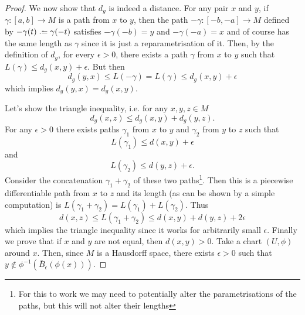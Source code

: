 \documentclass[12pt,twoside]{book}
\begin{document}
\begin{proof}
	We now show that \( d_g \) is indeed a distance.  For
	any pair \( x \) and \( y \), if \( \gamma \colon [a,b] \to M \) is a path from \( x \)
	to \( y \), then the path \( -\gamma \colon [-b,-a] \to M \)  defined by \( -\gamma(t)
	\defeq \gamma(-t) \) satisfies \( -\gamma(-b) = y \) and \( -\gamma(-a) = x \) and of
	course has the same length as \( \gamma \) since it is just a reparametrisation of it.
	Then, by the definition of \( d_g \), for every \( \epsilon > 0 \), there exists a path
	\( \gamma \) from \( x \) to \( y \) such that \( L(\gamma) \leq d_g(x,y) + \epsilon \).
	But then 
	\begin{equation*}
		d_g(y,x) \leq L(-\gamma) = L(\gamma) \leq d_g(x,y) + \epsilon
	\end{equation*}
	which implies \( d_g(y,x) = d_g(x,y) \). 

	Let's show the triangle inequality, i.e. for any \( x,y,z \in M \)
	\begin{equation*}
		d_g(x,z) \leq d_g(x,y) + d_g(y,z).
	\end{equation*}
	For any \( \epsilon > 0 \) there exists paths \( \gamma_1 \) from \( x \) to \( y \) and
	\( \gamma_2 \) from \( y  \) to \( z \) such that
	\begin{equation*}
		L(\gamma_1) \leq d(x,y) + \epsilon
	\end{equation*}
	and
	\begin{equation*}
		L(\gamma_2) \leq d(y,z) + \epsilon. 
	\end{equation*}
	Consider the concatenation \( \gamma_1 + \gamma_2 \) of these two paths\footnote{For
	this to work we may need to potentially alter the parametrisations of the paths, but
	this will not alter their lengths}. Then this is a piecewise differentiable path from
	\( x \) to \( z \) and its length (as can be shown by a simple computation) is \(
	L(\gamma_1 + \gamma_2) = L(\gamma_1) + L(\gamma_2) \). Thus
	\begin{equation*}
		d(x,z) \leq L(\gamma_1 + \gamma_2) \leq d(x,y) + d(y,z) + 2\epsilon
	\end{equation*}
	which implies the triangle inequality since it works for arbitrarily small \( \epsilon
	\).
	Finally we prove that if \( x \) and \( y \) are not equal, then \( d(x,y) > 0 \). Take
	a chart \( (U, \phi) \) around \( x \). Then, since \( M \) is a Hausdorff space, there
	exists \( \epsilon > 0 \) such that \( y \notin
	\phi^{-1}\left(\bar{B}_\epsilon(\phi(x))\right) \). 


\end{proof}
\end{document}
